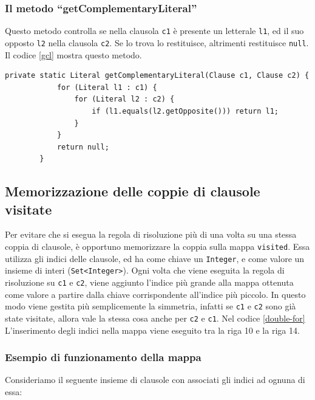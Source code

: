 \documentclass[a4paper,12pt]{report}
\begin{document}
\subsubsection{Il metodo ``getComplementaryLiteral''}
\label{getComplementaryLiteral}
Questo metodo controlla se nella clausola \texttt{c1} è presente un letterale \texttt{l1}, ed il suo opposto \texttt{l2} nella clausola \texttt{c2}. Se lo trova lo restituisce, altrimenti restituisce \texttt{null}. Il codice \ref*{gcl} mostra questo metodo. 

\begin{minipage}{\linewidth}
    \begin{lstlisting}[caption={Metodo ``getComplementaryLiteral'' della classe Resolution}, label={gcl}]
        private static Literal getComplementaryLiteral(Clause c1, Clause c2) { 
            for (Literal l1 : c1) {
                for (Literal l2 : c2) { 
                    if (l1.equals(l2.getOpposite())) return l1;
                }
            }
            return null;
        }
    \end{lstlisting}
\end{minipage}

\subsection{Memorizzazione delle coppie di clausole visitate}
\label{visited}
Per evitare che si esegua la regola di risoluzione più di una volta su una stessa coppia di clausole, è opportuno memorizzare la coppia sulla mappa \texttt{visited}. Essa utilizza gli indici delle clausole, ed ha come chiave un \texttt{Integer}, e come valore un insieme di interi (\texttt{Set<Integer>}). Ogni volta che viene eseguita la regola di risoluzione su \texttt{c1} e \texttt{c2}, viene aggiunto l'indice più grande alla mappa ottenuta come valore a partire dalla chiave corrispondente all'indice più piccolo. In questo modo viene gestita più semplicemente la simmetria, infatti se \texttt{c1} e \texttt{c2} sono già state visitate, allora vale la stessa cosa anche per \texttt{c2} e \texttt{c1}. Nel codice \ref{double-for} L'inserimento degli indici nella mappa viene eseguito tra la riga 10 e la riga 14.

\subsubsection{Esempio di funzionamento della mappa}
Consideriamo il seguente insieme di clausole con associati gli indici ad ognuna di essa:
\end{document}
